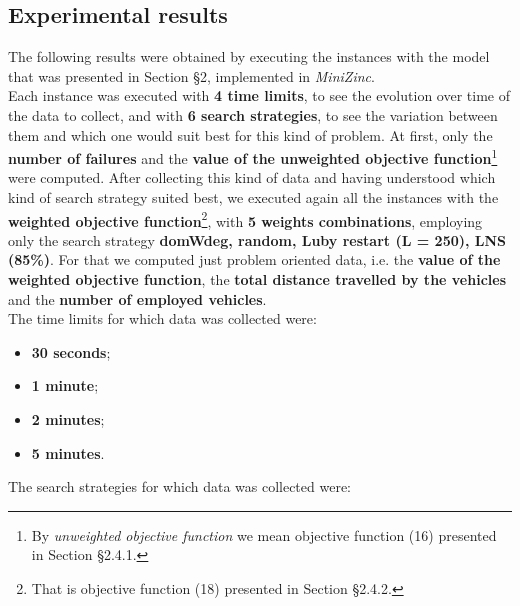 \documentclass[../main.tex]{subfiles}
\begin{document}
\subsection{Experimental results}
\label{subsec:experimental-results}
The following results were obtained by executing the instances with the model that was presented in Section §2, implemented in \textit{MiniZinc}.\\
Each instance was executed with \textbf{4 time limits}, to see the evolution over time of the data to collect, and with \textbf{6 search strategies}, to see the variation between them and which one would suit best for this kind of problem.
At first, only the \textbf{number of failures} and the \textbf{value of the unweighted objective function}\footnote{By \textit{unweighted objective function} we mean objective function (16) presented in Section §2.4.1.} were computed.
After collecting this kind of data and having understood which kind of search strategy suited best, we executed again all the instances with the \textbf{weighted objective function}\footnote{That is objective function (18) presented in Section §2.4.2.}, with \textbf{5 weights combinations}, employing only the search strategy \textbf{domWdeg, random, Luby restart (L = 250), LNS (85\%)}.
For that we computed just problem oriented data, i.e. the \textbf{value of the weighted objective function}, the \textbf{total distance travelled by the vehicles} and the \textbf{number of employed vehicles}.\\
The time limits for which data was collected were:
\begin{itemize}
    \item \textbf{30 seconds};
    \item \textbf{1 minute};
    \item \textbf{2 minutes};
    \item \textbf{5 minutes}.
\end{itemize}
The search strategies for which data was collected were:
\end{document}
